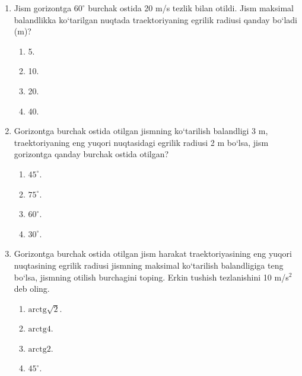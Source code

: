\begin{enumerate}
\begin{center}
\end{center}
\begin{enumerate}[label=\Alph*)]
\item 4/5.
\item 5/7.
\item 7/9.
\item 1.
\end{enumerate}



\item Jism gorizontga $60^\circ$ burchak ostida 20 m/s tezlik bilan otildi. Jism maksimal balandlikka ko‘tarilgan nuqtada traektoriyaning egrilik radiusi qanday bo‘ladi (m)?
\begin{enumerate}[label=\Alph*)]
\item 5.
\item 10.
\item 20.
\item 40.
\end{enumerate}

\item Gorizontga burchak ostida otilgan jismning ko‘tarilish balandligi 3 m, traektoriyaning eng yuqori nuqtasidagi egrilik radiusi 2 m bo‘lsa, jism gorizontga qanday burchak ostida otilgan?
\begin{enumerate}[label=\Alph*)]
\item $45^\circ$.
\item $75^\circ$.
\item $60^\circ$.
\item $30^\circ$.
\end{enumerate}

\item Gorizontga burchak ostida otilgan jism harakat traektoriyasining eng yuqori nuqtasining egrilik radiusi jismning maksimal ko‘tarilish balandligiga teng bo‘lsa, jismning otilish burchagini toping. Erkin tushish tezlanishini 10 m/s$^2$ deb oling.
\begin{enumerate}[label=\Alph*)]
\item $\text{arctg}\sqrt{2}$.
\item $\text{arctg}4$.
\item $\text{arctg}2$.
\item $45^\circ$.
\end{enumerate}


\end{enumerate}
